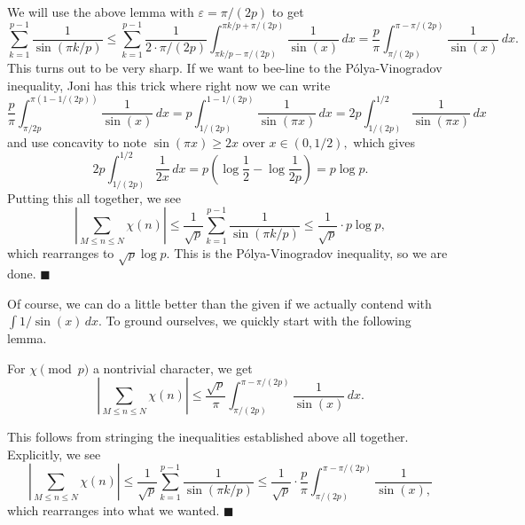 We will use the above lemma with $\varepsilon=\pi/(2p)$ to get
\[\sum_{k=1}^{p-1}\frac1{\sin(\pi k/p)}\le\sum_{k=1}^{p-1}\frac1{2\cdot\pi/(2p)}\int_{\pi k/p-\pi/(2p)}^{\pi k/p+\pi/(2p)}\frac1{\sin(x)}\,dx=\frac p\pi\int_{\pi/(2p)}^{\pi-\pi/(2p)}\frac1{\sin(x)}\,dx.\]
This turns out to be very sharp. If we want to bee-line to the P\'olya-Vinogradov inequality, Joni has this trick where right now we can write
\[\frac p\pi\int_{\pi/2p}^{\pi(1-1/(2p))}\frac1{\sin(x)}\,dx=p\int_{1/(2p)}^{1-1/(2p)}\frac1{\sin(\pi x)}\,dx=2p\int_{1/(2p)}^{1/2}\frac1{\sin(\pi x)}\,dx\]
and use concavity to note $\sin(\pi x)\ge2x$ over $x\in(0,1/2),$ which gives
\[2p\int_{1/(2p)}^{1/2}\frac1{2x}\,dx=p\left(\log\frac12-\log\frac1{2p}\right)=p\log p.\]
Putting this all together, we see
\[\left|\sum_{M\le n\le N}\chi(n)\right|\le\frac1{\sqrt p}\sum_{k=1}^{p-1}\frac1{\sin(\pi k/p)}\le\frac1{\sqrt p}\cdot p\log p,\]
which rearranges to $\sqrt p\log p.$ This is the P\'olya-Vinogradov inequality, so we are done. $\blacksquare$

Of course, we can do a little better than the given if we actually contend with $\int1/\sin(x)\,dx.$ To ground ourselves, we quickly start with the following lemma.
\begin{lemma}
    For $\chi\pmod p$ a nontrivial character, we get
    \[\left|\sum_{M\le n\le N}\chi(n)\right|\le\frac{\sqrt p}\pi\int_{\pi/(2p)}^{\pi-\pi/(2p)}\frac1{\sin(x)}\,dx.\]
\end{lemma}
This follows from stringing the inequalities established above all together. Explicitly, we see
\[\left|\sum_{M\le n\le N}\chi(n)\right|\le\frac1{\sqrt p}\sum_{k=1}^{p-1}\frac1{\sin(\pi k/p)}\le\frac1{\sqrt p}\cdot\frac p\pi\int_{\pi/(2p)}^{\pi-\pi/(2p)}\frac1{\sin(x),}\]
which rearranges into what we wanted. $\blacksquare$

